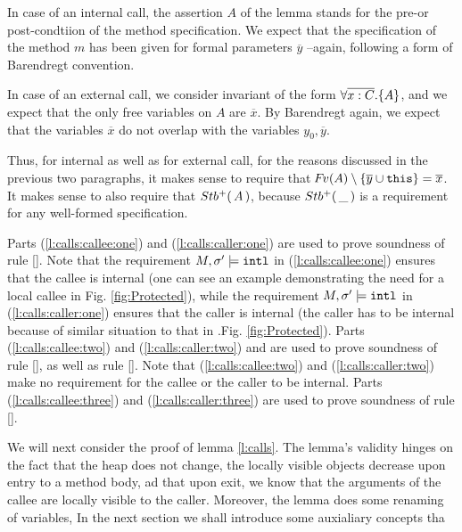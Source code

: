 In case of an internal call, the assertion $A$ of the lemma stands for the pre-or post-condtiion
of the method specification.
We  expect that the specification of the method $m$ has been
given for formal parameters $\overline y$ --again, following a form of Barendregt convention.

In case of an external call, we consider invariant of the form ${\forall {\overline {x:C}}.{{\{}}{A}{{\}}}}$, and we
expect that the only free variables on $A$ are    $\overline x$.
By Barendregt again, we expect that the variables $\overline x$ do not overlap with the variables $y_0, \overline y$.


Thus, for internal as well as for external call, for the reasons discussed in the previous two paragraphs, it makes sense to require that  ${\hspace{-1pt}F\hspace{-1pt}}v(A)\setminus\{ {\overline{y}} \cup \mbox{\normalfont{\texttt{this}}} \} =\overline{x}$. 
It makes sense to also require that ${Stb^+(\, A\, )}$, because ${Stb^+(\, \_\, )}$ is a requirement for any well-formed  specification.

 
Parts  (\ref{l:calls:callee:one})  and (\ref{l:calls:caller:one})  are  used to prove soundness of rule {[]}.
  Note that the requirement $M, \sigma' \models \mbox{\normalfont{\texttt{intl}}} $  in (\ref{l:calls:callee:one}) ensures that the callee is internal
  (one can see an example demonstrating the need for a local callee in Fig.  \ref{fig:Protected}),
  while the requirement $M, \sigma' \models \mbox{\normalfont{\texttt{intl}}} $  in   (\ref{l:calls:caller:one}) ensures that the caller is internal
  (the caller has to be internal because of similar situation to that in .Fig.  \ref{fig:Protected}).
Parts
 (\ref{l:calls:callee:two}) and (\ref{l:calls:caller:two}) and are  used to prove soundness of rule {[]},
as well as rule {[]}.
  Note that   (\ref{l:calls:callee:two}) and (\ref{l:calls:caller:two}) make no requirement for the callee or the caller to be internal.  
 Parts
(\ref{l:calls:callee:three}) and (\ref{l:calls:caller:three}) are  used to prove soundness of rule {[]}.

\vspace{.4cm}
We will next consider the proof of lemma  \ref{l:calls}.
The lemma's validity hinges on the fact that the  heap does not change,
 the locally visible objects decrease upon entry to a method body, ad that  upon exit, we know that the arguments of the callee are 
 locally visible to the caller.
Moreover, the lemma does some renaming of variables,
In the next section we shall introduce some auxialiary concepts tha 


